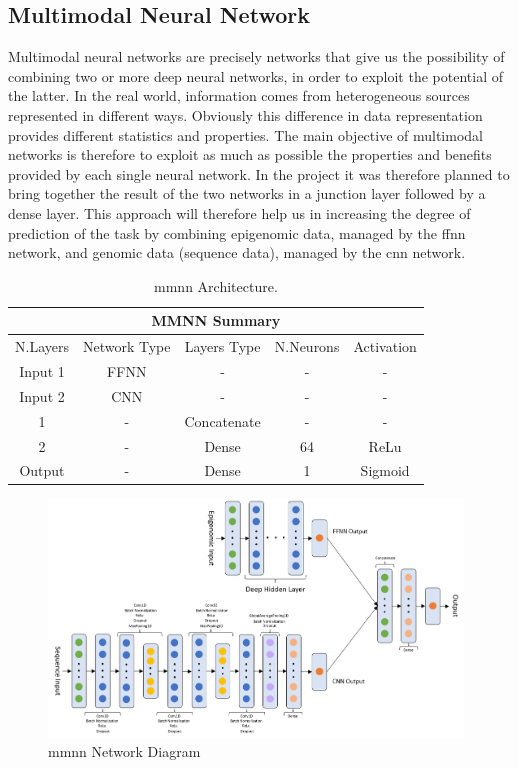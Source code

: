 \documentclass{article}
\begin{document}
\subsection{Multimodal Neural Network}
Multimodal neural networks are precisely networks that give us the possibility of combining two or more deep neural networks, in order to exploit the potential of the latter.
In the real world, information comes from heterogeneous sources represented in different ways. Obviously this difference in data representation provides different statistics and properties. The main objective of multimodal networks is therefore to exploit as much as possible the properties and benefits provided by each single neural network.
In the project it was therefore planned to bring together the result of the two networks in a junction layer followed by a dense layer. This approach will therefore help us in increasing the degree of prediction of the task by combining epigenomic data, managed by the \acrshort{ffnn} network, and genomic data (sequence data), managed by the \acrshort{cnn} network.
\begin{table}[!ht]
\begin{center}
\begin{tabular}{ |c|c|c|c|c| }
 \hline
 \multicolumn{5}{|c|}{MMNN Summary} \\
 \hline
    N.Layers & Network Type & Layers Type & N.Neurons & Activation\\
 \hline
    Input 1 &  FFNN & - & - &   -\\
    Input 2 &  CNN & - & - &   -\\
    1   & - & Concatenate & - &   -\\
    2   & - & Dense & 64 &   ReLu\\
    Output  & - & Dense & 1 &   Sigmoid\\
 \hline
\end{tabular}
\caption{\label{tab:MMNN_Summary} \acrshort{mmnn}  Architecture.}
\end{center}
\end{table}

\begin{figure}[!ht]
    \centering
    \includegraphics[width=11cm]{image/MMNN_Diagram.PNG}
    \caption{\acrshort{mmnn} Network Diagram}
    \label{fig:MMNN_Diagram}
\end{figure}
\end{document}
